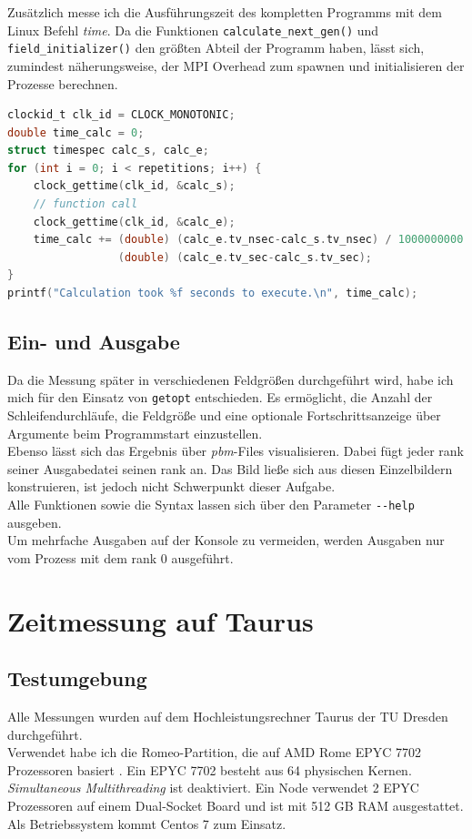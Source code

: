 \documentclass[german,plainarticle,hyperref,utf8]{zihpub}
\begin{document}
	Zusätzlich messe ich die Ausführungszeit des kompletten Programms mit dem Linux Befehl \textit{time}. Da die Funktionen \texttt{calculate\_next\_gen()} und \texttt{field\_initializer()} den größten Abteil der Programm haben, lässt sich, zumindest näherungsweise, der MPI Overhead zum spawnen und initialisieren der Prozesse berechnen.
	\begin{lstlisting}[language=C, caption=Berechnung der Ausführungszeit eines \textit{function calls}]
clockid_t clk_id = CLOCK_MONOTONIC;
double time_calc = 0;
struct timespec calc_s, calc_e;
for (int i = 0; i < repetitions; i++) {
	clock_gettime(clk_id, &calc_s);
	// function call
	clock_gettime(clk_id, &calc_e);
	time_calc += (double) (calc_e.tv_nsec-calc_s.tv_nsec) / 1000000000 +
	             (double) (calc_e.tv_sec-calc_s.tv_sec);
}
printf("Calculation took %f seconds to execute.\n", time_calc);
\end{lstlisting}
	
	\subsection{Ein- und Ausgabe}
	Da die Messung später in verschiedenen Feldgrößen durchgeführt wird, habe ich mich für den Einsatz von \verb|getopt| entschieden. Es ermöglicht, die Anzahl der Schleifendurchläufe, die Feldgröße und eine optionale Fortschrittsanzeige über Argumente beim Programmstart einzustellen.\\
	Ebenso lässt sich das Ergebnis über \textit{pbm}-Files visualisieren. Dabei fügt jeder rank seiner Ausgabedatei seinen rank an. Das Bild ließe sich aus diesen Einzelbildern konstruieren, ist jedoch nicht Schwerpunkt dieser Aufgabe.\\
	Alle Funktionen sowie die Syntax lassen sich über den Parameter \texttt{-{}-help} ausgeben.\\
	
	Um mehrfache Ausgaben auf der Konsole zu vermeiden, werden Ausgaben nur vom Prozess mit dem rank 0 ausgeführt.
	\newpage
	\section{Zeitmessung auf Taurus}
	\subsection{Testumgebung} \label{umgebung}
	Alle Messungen wurden auf dem Hochleistungsrechner Taurus der TU Dresden durchgeführt.\\
	Verwendet habe ich die Romeo-Partition, die auf AMD Rome EPYC 7702 Prozessoren basiert \cite{hpc}. Ein EPYC 7702 besteht aus 64 physischen Kernen. \textit{Simultaneous Multithreading} ist deaktiviert. Ein Node verwendet 2 EPYC Prozessoren auf einem Dual-Socket Board und ist mit 512 GB RAM ausgestattet. Als Betriebssystem kommt Centos 7 zum Einsatz.\\
	
\end{document}

